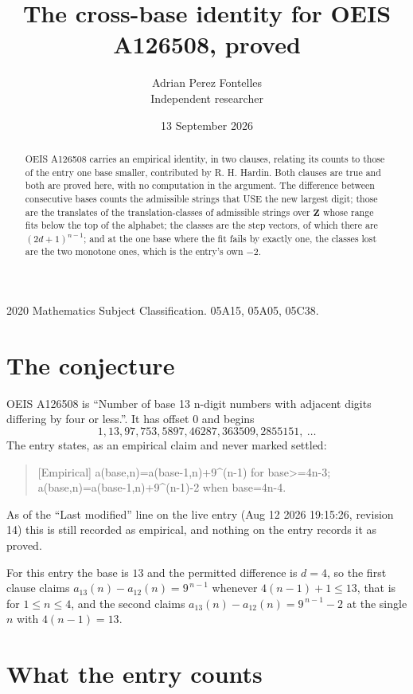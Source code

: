 \documentclass[11pt,a4paper]{article}
\title{The cross-base identity for OEIS A126508, proved}
\author{Adrian Perez Fontelles\\ \small Independent researcher}
\date{13 September 2026}
\theoremstyle{plain}
\theoremstyle{definition}
\begin{document}
\maketitle

\begin{abstract}
OEIS A126508 carries an empirical identity, in two clauses, relating its counts to those of the
entry one base smaller, contributed by R. H. Hardin. Both clauses are true and both are proved
here, with no computation in the argument. The difference between consecutive bases counts the
admissible strings that USE the new largest digit; those are the translates of the
translation-classes of admissible strings over $\mathbf{Z}$ whose range fits below the top of
the alphabet; the classes are the step vectors, of which there are $(2d+1)^{n-1}$; and at the
one base where the fit fails by exactly one, the classes lost are the two monotone ones, which
is the entry's own $-2$.
\end{abstract}

\noindent\small 2020 Mathematics Subject Classification. 05A15, 05A05, 05C38.\normalsize

\section{The conjecture}

OEIS A126508 is ``Number of base 13 n-digit numbers with adjacent digits differing by four or less.''. It has offset $0$ and begins
\[
1, 13, 97, 753, 5897, 46287, 363509, 2855151,\ \dots
\]
The entry states, as an empirical claim and never marked settled:
\begin{quote}
[Empirical] a(base,n)=a(base-1,n)+9\textasciicircum{}(n-1) for base>=4n-3; a(base,n)=a(base-1,n)+9\textasciicircum{}(n-1)-2 when base=4n-4.
\end{quote}
As of the ``Last modified'' line on the live entry (Aug 12 2026 19:15:26, revision 14)
this is still recorded as empirical, and nothing on the entry records it as proved.

For this entry the base is $13$ and the permitted difference is $d=4$, so the first clause
claims $a_{13}(n)-a_{12}(n)=9^{\,n-1}$ whenever $4(n-1)+1\le13$, that is for
$1\le n\le4$, and the second claims $a_{13}(n)-a_{12}(n)=9^{\,n-1}-2$ at the single
$n$ with $4(n-1)=13$.

\section{What the entry counts}
\end{document}
